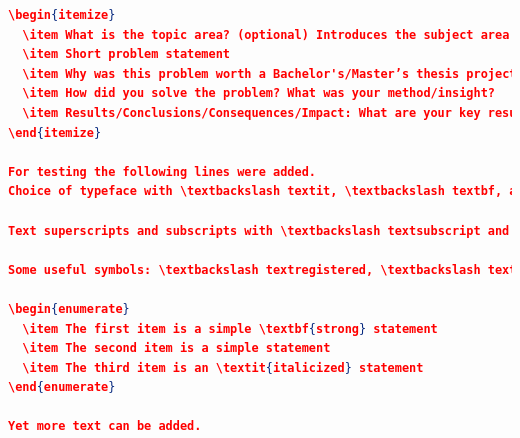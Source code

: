 \begin{lstlisting}[language={json}, caption={Resulting fordiva.json file}, label=lst:resultingForDIVAfile]
\begin{itemize}
  \item What is the topic area? (optional) Introduces the subject area for the project.
  \item Short problem statement
  \item Why was this problem worth a Bachelor's/Master’s thesis project? (\ie, why is the problem both significant and of a suitable degree of difficulty for a Bachelor's/Master’s thesis project? Why has no one else solved it yet?)
  \item How did you solve the problem? What was your method/insight?
  \item Results/Conclusions/Consequences/Impact: What are your key results/\linebreak[4]conclusions? What will others do based upon your results? What can be done now that you have finished - that could not be done before your thesis project was completed?
\end{itemize}

For testing the following lines were added.
Choice of typeface with \textbackslash textit, \textbackslash textbf, and \textbackslash texttt:  \textit{x}, \textbf{x}, and \texttt{x}

Text superscripts and subscripts with \textbackslash textsubscript and \textbackslash textsuperscript: A\textsubscript{x} and A\textsuperscript{x}

Some useful symbols: \textbackslash textregistered, \textbackslash texttrademark, and \textbackslash textcopyright. For example, copyright symbol: \textbackslash textcopyright Maguire 2021, and some superscripts: \textbackslash textsuperscript\{99m\}Tc, A\textbackslash textsuperscript\{*\}, A\textbackslash textsuperscript\{\textbackslash textregistered\}, and A\textbackslash texttrademark : \textcopyright Maguire 2021, and some superscripts: \textsuperscript{99m}Tc, A\textsuperscript{*}, A\textsuperscript{\textregistered}, and A\texttrademark. Another example: H\textbackslash textsubscript\{2\}O: H\textsubscript{2}O

\begin{enumerate}
  \item The first item is a simple \textbf{strong} statement
  \item The second item is a simple statement
  \item The third item is an \textit{italicized} statement
\end{enumerate}

Yet more text can be added.


\end{lstlisting}
